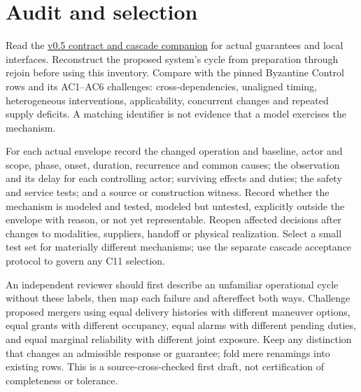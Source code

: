 \documentclass[11pt]{article}
\begin{document}
\section{Audit and selection}
Read the \href{https://github.com/eternal-november/eos-research-programmes/tree/130b59e57ce37c999ac8848eaee45b0a09ac66b4/projects/swarm-coordination/contracts}{v0.5 contract and cascade companion} for actual guarantees and local interfaces. Reconstruct the proposed system's cycle from preparation through rejoin before using this inventory. Compare with the pinned Byzantine Control rows and its AC1--AC6 challenges: cross-dependencies, unaligned timing, heterogeneous interventions, applicability, concurrent changes and repeated supply deficits. A matching identifier is not evidence that a model exercises the mechanism.

For each actual envelope record the changed operation and baseline, actor and scope, phase, onset, duration, recurrence and common causes; the observation and its delay for each controlling actor; surviving effects and duties; the safety and service tests; and a source or construction witness. Record whether the mechanism is modeled and tested, modeled but untested, explicitly outside the envelope with reason, or not yet representable. Reopen affected decisions after changes to modalities, suppliers, handoff or physical realization. Select a small test set for materially different mechanisms; use the separate cascade acceptance protocol to govern any C11 selection.

An independent reviewer should first describe an unfamiliar operational cycle without these labels, then map each failure and aftereffect both ways. Challenge proposed mergers using equal delivery histories with different maneuver options, equal grants with different occupancy, equal alarms with different pending duties, and equal marginal reliability with different joint exposure. Keep any distinction that changes an admissible response or guarantee; fold mere renamings into existing rows. This is a source-cross-checked first draft, not certification of completeness or tolerance.
\end{document}
